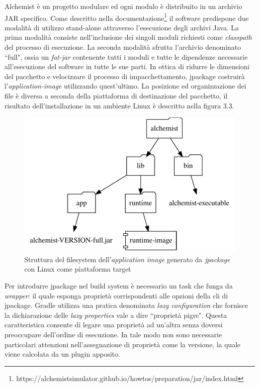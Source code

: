 Alchemist è un progetto modulare ed ogni modulo è distribuito in un archivio JAR specifico. Come descritto nella documentazione\footnote{https://alchemistsimulator.github.io/howtos/preparation/jar/index.html} il software predispone due modalità di utilizzo stand-alone attraverso l'esecuzione degli archivi Java. La prima modalità consiste nell'inclusione dei singoli moduli richiesti come \textit{classpath} del processo di esecuzione. La seconda modalità sfrutta l'archivio denominato ``full", ossia un \textit{fat-jar} contenente tutti i moduli e tutte le dipendenze necessarie all'esecuzione del software in tutte le sue parti. In ottica di ridurre le dimensioni del pacchetto e velocizzare il processo di impacchettamento, jpackage costruirà l'\textit{application-image} utilizzando quest'ultimo. La posizione ed organizzazione dei file è diversa a seconda della piattaforma di destinazione del pacchetto, il risultato dell'installazione in un ambiente Linux è descritto nella figura 3.3.  

\begin{figure}
	\centering
	\includegraphics[width=.7\linewidth]{figures/application-image-folder-structure.pdf}
	\caption{Struttura del filesystem dell'\textit{application image} generato da \textit{jpackage} con Linux come piattaforma target}
	\label{fig:application-image-folder-structure}
\end{figure}

Per introdurre jpackage nel build system è necessario un task che funga da \textit{wrapper}: il quale esponga proprietà corrispondenti alle opzioni della \ac{cli} di jpackage. Gradle utilizza una pratica denominata \textit{lazy configuration} che fornisce la dichiarazione delle \textit{lazy properties} vale a dire ``proprietà pigre". Questa caratteristica consente di legare una proprietà ad un'altra senza doversi preoccupare dell'ordine di esecuzione. In tale modo non sono necessarie particolari attenzioni nell'assegnazione di proprietà come la versione, la quale viene calcolata da un plugin apposito.

